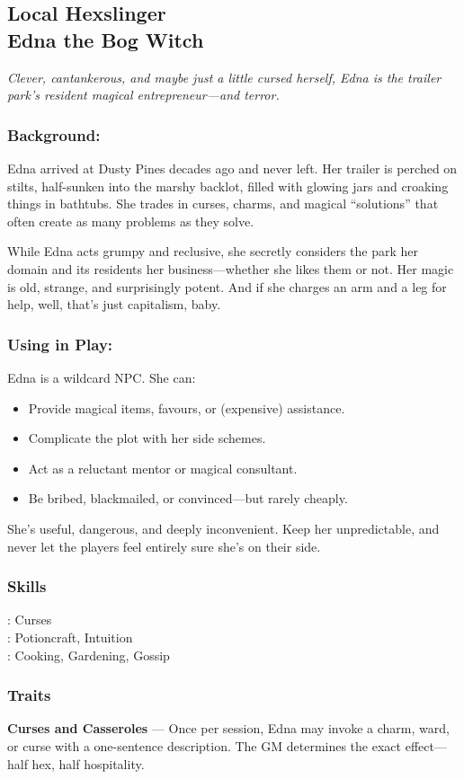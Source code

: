 \subsection{{\small Local Hexslinger}\\ Edna the Bog Witch}
\label{npc:edna-bogwitch}

\emph{Clever, cantankerous, and maybe just a little cursed herself, Edna is the trailer park’s resident magical entrepreneur—and terror.}
\vspace{.5\baselineskip}

\begin{paracol}{3}
    \subsubsection*{Background:}
    Edna arrived at Dusty Pines decades ago and never left. Her trailer is perched on stilts, half-sunken into the marshy backlot, filled with glowing jars and croaking things in bathtubs. She trades in curses, charms, and magical “solutions” that often create as many problems as they solve.

    While Edna acts grumpy and reclusive, she secretly considers the park her domain and its residents her business—whether she likes them or not. Her magic is old, strange, and surprisingly potent. And if she charges an arm and a leg for help, well, that’s just capitalism, baby.

    \switchcolumn
    \subsubsection*{Using in Play:}
    Edna is a wildcard NPC. She can:
    \begin{itemize}
      \item Provide magical items, favours, or (expensive) assistance.
      \item Complicate the plot with her side schemes.
      \item Act as a reluctant mentor or magical consultant.
      \item Be bribed, blackmailed, or convinced—but rarely cheaply.
    \end{itemize}
    She’s useful, dangerous, and deeply inconvenient. Keep her unpredictable, and never let the players feel entirely sure she’s on their side.

    \switchcolumn
    \subsubsection{Skills}
      \noindent\Expert: Curses \\
      \noindent\Skilled: Potioncraft, Intuition \\
      \noindent\Novice: Cooking, Gardening, Gossip \\
    \subsubsection{Traits}
      \textbf{Curses and Casseroles} — Once per session, Edna may invoke a charm, ward, or curse with a one-sentence description. The GM determines the exact effect—half hex, half hospitality.
\end{paracol}
